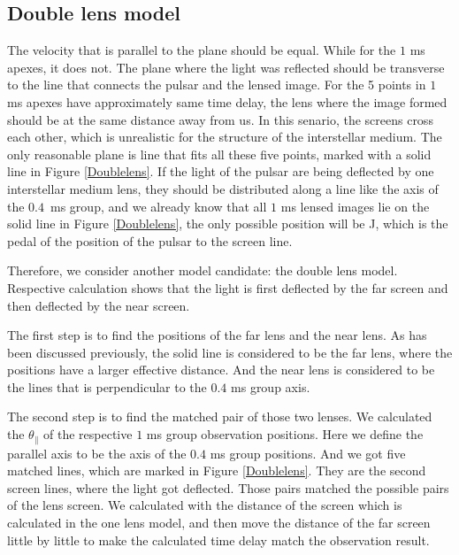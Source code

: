 \documentclass[useAMS,usenatbib]{mn2e}
\begin{document}
\subsection{Double lens model}
The velocity that is parallel to the plane should be equal. While for the $1$ ms apexes, it does not. The plane where the light was reflected should be transverse to the line that connects the pulsar and the lensed image. For the 5 points in $1$ ms apexes have approximately same time delay, the lens where the image formed should be at the same distance away from us. In this senario, the screens cross each other, which is unrealistic for the structure of the interstellar medium. The only reasonable plane is line that fits all these five points, marked with a solid line in Figure \ref{Doublelens}.
 If the light of the pulsar are being deflected by one interstellar medium lens, they should be distributed along a line like the axis of the $0.4$\ ms group, and we already know that all $1$ ms lensed images lie on the solid line in Figure \ref{Doublelens}, the only possible position will be J, which is the pedal of the position of the pulsar to the screen line.

Therefore, we consider another model candidate: the double lens model. Respective calculation shows that the light is first deflected by the far screen and then deflected by the near screen. 

The first step is to find the positions of the far lens and the near lens. As has been discussed previously, the solid line is considered to be the far lens, where the positions have a larger effective distance. And the near lens is considered to be the lines that is perpendicular to the $0.4$ ms group axis. 

The second step is to find the matched pair of those two lenses. We calculated the $\theta_{\parallel}$ of the respective $1$ ms group observation positions. Here we define the parallel axis to be the axis of the $0.4$ ms group positions. And we got five matched lines, which are marked in Figure \ref{Doublelens}. They are the second screen lines, where the light got deflected. Those pairs matched the possible pairs of the lens screen. We calculated with the distance of the screen which is calculated in the one lens model, and then move the distance of the far screen little by little to make the calculated time delay match the observation result.
\end{document}
